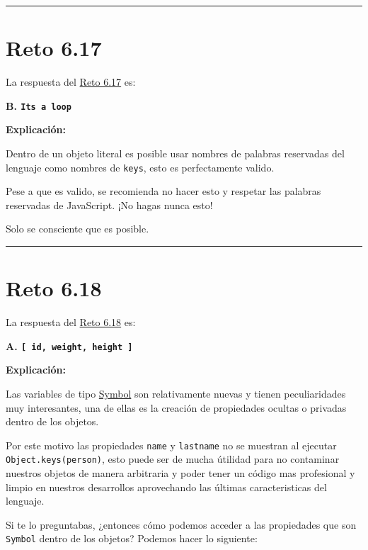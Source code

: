 \documentclass[
  letterpaper,
  DIV=11,
  numbers=noendperiod]{scrreprt}
\begin{document}
\begin{center}\rule{0.5\linewidth}{0.5pt}\end{center}

\section{Reto 6.17}\label{sec-sol-cap6-reto17}

La respuesta del \hyperref[sec-cap6-reto17]{Reto 6.17} es:

\textbf{B. \texttt{It\textquotesingle{}s\ a\ loop}}

\textbf{Explicación:}

Dentro de un objeto literal es posible usar nombres de palabras
reservadas del lenguaje como nombres de \texttt{keys}, esto es
perfectamente valido.

Pese a que es valido, se recomienda no hacer esto y respetar las
palabras reservadas de JavaScript. ¡No hagas nunca esto!

Solo se consciente que es posible.

\begin{center}\rule{0.5\linewidth}{0.5pt}\end{center}

\section{Reto 6.18}\label{sec-sol-cap6-reto18}

La respuesta del \hyperref[sec-cap6-reto18]{Reto 6.18} es:

\textbf{A.
\texttt{{[}\ \textquotesingle{}id\textquotesingle{},\ \textquotesingle{}weight\textquotesingle{},\ \textquotesingle{}height\textquotesingle{}\ {]}}}

\textbf{Explicación:}

Las variables de tipo \hyperref[glos-symbol]{Symbol} son relativamente
nuevas y tienen peculiaridades muy interesantes, una de ellas es la
creación de propiedades ocultas o privadas dentro de los objetos.

Por este motivo las propiedades \texttt{name} y \texttt{lastname} no se
muestran al ejecutar \texttt{Object.keys(person)}, esto puede ser de
mucha útilidad para no contaminar nuestros objetos de manera arbitraria
y poder tener un código mas profesional y limpio en nuestros desarrollos
aprovechando las últimas caracteristicas del lenguaje.

Si te lo preguntabas, ¿entonces cómo podemos acceder a las propiedades
que son \texttt{Symbol} dentro de los objetos? Podemos hacer lo
siguiente:
\end{document}
